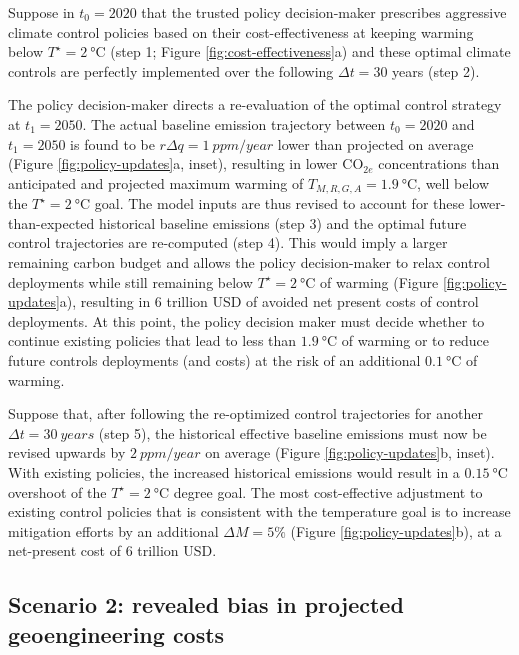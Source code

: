 \documentclass[9pt,twocolumn,twoside,lineno]{pnas-new}
\begin{document}
Suppose in $t_{0} = 2020$ that the trusted policy decision-maker prescribes aggressive climate control policies based on their cost-effectiveness at keeping warming below $T^{\star} = \SI{2}{\celsius}$ (step 1; Figure \ref{fig:cost-effectiveness}a) and these optimal climate controls are perfectly implemented over the following $\Delta t = 30$ years (step 2).

The policy decision-maker directs a re-evaluation of the optimal control strategy at $t_{1} = 2050$. The actual baseline emission trajectory between $t_{0}=2020$ and $t_{1}=2050$ is found to be $r\Delta q = \SI{1}{ppm/year}$ lower than projected on average (Figure \ref{fig:policy-updates}a, inset), resulting in lower CO$_{2e}$ concentrations than anticipated and projected maximum warming of $T_{M,R,G,A} = \SI{1.9}{\celsius}$, well below the $T^{\star} = \SI{2}{\celsius}$ goal. The model inputs are thus revised to account for these lower-than-expected historical baseline emissions (step 3) and the optimal future control trajectories are re-computed (step 4). This would imply a larger remaining carbon budget \citep{millar_cumulative_2016} and allows the policy decision-maker to relax control deployments while still remaining below $T^{\star} = \SI{2}{\celsius}$ of warming (Figure \ref{fig:policy-updates}a), resulting in $6$ trillion USD of avoided net present costs of control deployments. At this point, the policy decision maker must decide whether to continue existing policies that lead to less than $\SI{1.9}{\celsius}$ of warming or to reduce future controls deployments (and costs) at the risk of an additional $\SI{0.1}{\celsius}$ of warming.

Suppose that, after following the re-optimized control trajectories for another $\Delta t = \SI{30}{years}$ (step 5), the historical effective baseline emissions must now be revised upwards by $\SI{2}{ppm/year}$ on average (Figure \ref{fig:policy-updates}b, inset). With existing policies, the increased historical emissions would result in a $\SI{0.15}{\celsius}$ overshoot of the $T^{\star} = \SI{2}{\celsius}$ degree goal. The most cost-effective adjustment to existing control policies that is consistent with the temperature goal is to increase mitigation efforts by an additional $\Delta M = 5\%$ (Figure \ref{fig:policy-updates}b), at a net-present cost of $6$ trillion USD.

\subsection*{Scenario 2: revealed bias in projected geoengineering costs}
\end{document}
